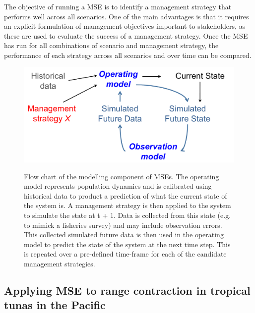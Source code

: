 \documentclass{article}
\begin{document}
The objective of running a MSE is to identify a management strategy
that performs well across all scenarios. One of the main advantages is that
it requires an explicit formulation of management objectives important
to stakeholders, as these are used to evaluate the success of a
management strategy. Once the MSE has run for all combinations of
scenario and management strategy, the performance of each strategy
across all scenarios and over time can be compared.

\begin{figure}
\begin{center}
\includegraphics[scale=0.5]{ResearchProposalSpring2013_MSEdiagram}
\label{msefig}
\caption{Flow chart of the modelling component of MSEs. The operating
  model represents population dynamics and is calibrated using
  historical data to product a prediction of what the current state of
  the system is. A management strategy is then applied to the system
  to simulate the state at t + 1. Data is collected from this
  state (e.g. to mimick a fisheries survey) and may include
  observation errors. This collected simulated future data is then
  used in the operating model to predict the state of the system at
  the next time step. This is repeated over a pre-defined time-frame
  for each of the candidate management strategies.}
\end{center}
\end{figure}

\subsection{Applying MSE to range contraction in tropical tunas in the
  Pacific}
\end{document}
